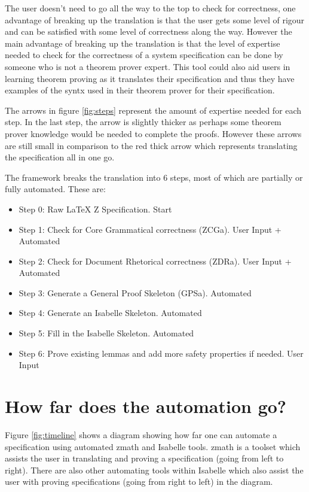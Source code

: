 The user doesn't need to go all the way to the top to check for correctness, one advantage of breaking up the translation is that the user gets some level of rigour and can be satisfied with some level of correctness along the way. However the main advantage of breaking up the translation is that the level of expertise needed to check for the correctness of a system specification can be done by someone who is not a theorem prover expert. This tool could also aid users in learning theorem proving as it translates their specification and thus they have examples of the syntx used in their theorem prover for their specification. 

The arrows in figure \ref{fig:steps} represent the amount of expertise needed for each step. In the last step, the arrow is slightly thicker as perhaps some theorem prover knowledge would be needed to complete the proofs. However these arrows are still small in comparison to the red thick arrow which represents translating the specification all in one go.

The framework breaks the translation into 6 steps, most of which are partially or fully automated. These are:

\begin{itemize}
\item Step 0: Raw LaTeX Z Specification. {\color{set}Start}
\item Step 1: Check for Core Grammatical correctness (ZCGa). {\color{set}User Input + Automated}
\item Step 2: Check for Document Rhetorical correctness (ZDRa). {\color{set}User Input + Automated}
\item Step 3: Generate a General Proof Skeleton (GPSa). {\color{set}Automated}
\item Step 4: Generate an Isabelle Skeleton. {\color{set}Automated}
\item Step 5: Fill in the Isabelle Skeleton. {\color{set}Automated}
\item Step 6: Prove existing lemmas and add more safety properties if needed. {\color{set}User Input}
\end{itemize}

\section{How far does the automation go?}

Figure \ref{fig:timeline} shows a diagram showing how far one can automate a specification using automated \gls{zmath} and Isabelle tools. \Gls{zmath} is a toolset which assists the user in translating and proving a specification (going from left to right). There are also other automating tools within Isabelle which also assist the user with proving specifications (going from right to left) in the diagram.

